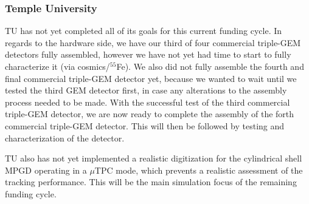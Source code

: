 \subsubsection{Temple University} 
TU has not yet completed all of its goals for this current funding cycle. In regards to the hardware side, we have our third of four commercial triple-GEM detectors fully assembled, however we have not yet had time to start to fully characterize it (via cosmics/$^{55}$Fe). We also did not fully assemble the fourth and final commercial triple-GEM detector yet, because we wanted to wait until we tested the third GEM detector first, in case any alterations to the assembly process needed to be made. With the successful test of the third commercial triple-GEM detector, we are now ready to complete the assembly of the forth commercial triple-GEM detector. This will then be followed by testing and characterization of the detector.

TU also has not yet implemented a realistic digitization for the cylindrical shell MPGD operating in a $\mu$TPC mode, which prevents a realistic assessment of the tracking performance. This will be the main simulation focus of the remaining funding cycle.

